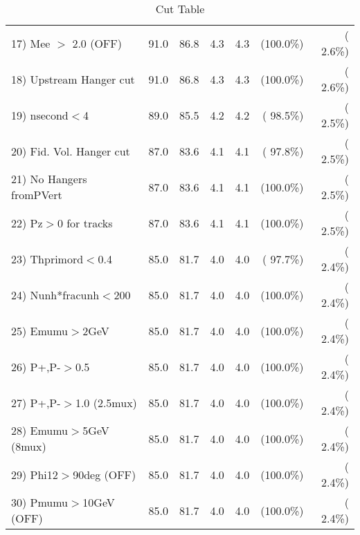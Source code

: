 \begin{table}[h!]
\begin{tabular}{||l||r|r|r|r|r|r||}
 17) Mee $>$ 2.0  (OFF)   &         91.0 &         86.8 &          4.3 &          4.3 & (100.0\%) & (  2.6\%) \\
 18) Upstream Hanger cut  &         91.0 &         86.8 &          4.3 &          4.3 & (100.0\%) & (  2.6\%) \\
 19) nsecond$<$4          &         89.0 &         85.5 &          4.2 &          4.2 & ( 98.5\%) & (  2.5\%) \\
 20) Fid. Vol. Hanger cut &         87.0 &         83.6 &          4.1 &          4.1 & ( 97.8\%) & (  2.5\%) \\
 21) No Hangers fromPVert &         87.0 &         83.6 &          4.1 &          4.1 & (100.0\%) & (  2.5\%) \\
 22) Pz$>$0 for tracks    &         87.0 &         83.6 &          4.1 &          4.1 & (100.0\%) & (  2.5\%) \\
 23) Thprimord$<$0.4      &         85.0 &         81.7 &          4.0 &          4.0 & ( 97.7\%) & (  2.4\%) \\
 24) Nunh*fracunh$<$200   &         85.0 &         81.7 &          4.0 &          4.0 & (100.0\%) & (  2.4\%) \\
 25) Emumu$>$2GeV         &         85.0 &         81.7 &          4.0 &          4.0 & (100.0\%) & (  2.4\%) \\
 26) P+,P-$>$0.5          &         85.0 &         81.7 &          4.0 &          4.0 & (100.0\%) & (  2.4\%) \\
 27) P+,P-$>$1.0 (2.5mux) &         85.0 &         81.7 &          4.0 &          4.0 & (100.0\%) & (  2.4\%) \\
 28) Emumu$>$5GeV  (8mux) &         85.0 &         81.7 &          4.0 &          4.0 & (100.0\%) & (  2.4\%) \\
 29) Phi12$>$90deg  (OFF) &         85.0 &         81.7 &          4.0 &          4.0 & (100.0\%) & (  2.4\%) \\
 30) Pmumu$>$10GeV  (OFF) &         85.0 &         81.7 &          4.0 &          4.0 & (100.0\%) & (  2.4\%) \\
 \hline
 \hline
 \end{tabular}
 \caption{Cut Table           }
 \label{tab-cutcohjpsi-mumu_cohphi0}
 \end{table}
